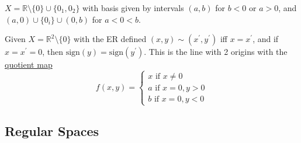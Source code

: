   \begin{example}
    \label{ex:line-with-two-origins}
    $X = \mathbb{R} \setminus \{0\} \cup \{0_1, 0_2\}$ with basis given by intervals $(a, b)$ for $b < 0$ or $a > 0$, and $(a, 0) \cup \{0_i\} \cup (0, b)$ for $a < 0 < b$. 
  \end{example}

  \begin{example}
    \label{ex:quotient_hausdorff}
    Given $X = \mathbb{R}^2 \setminus \{0\}$ with the ER defined $(x, y) \sim (x^\prime, y^\prime)$ iff $x = x^\prime$, and if $x = x^\prime = 0$, then $\mathrm{sign}(y) = \mathrm{sign}(y^\prime)$. This is the line with 2 origins with the \hyperref[def:quotient-map]{quotient map} 
    \begin{equation}
      f(x, y) = \begin{cases} 
        x \text{ if } x \neq 0 \\
        a \text{ if } x = 0, y > 0 \\ 
        b \text{ if } x = 0, y < 0
      \end{cases}
    \end{equation}
  \end{example}

\subsection{Regular Spaces}

